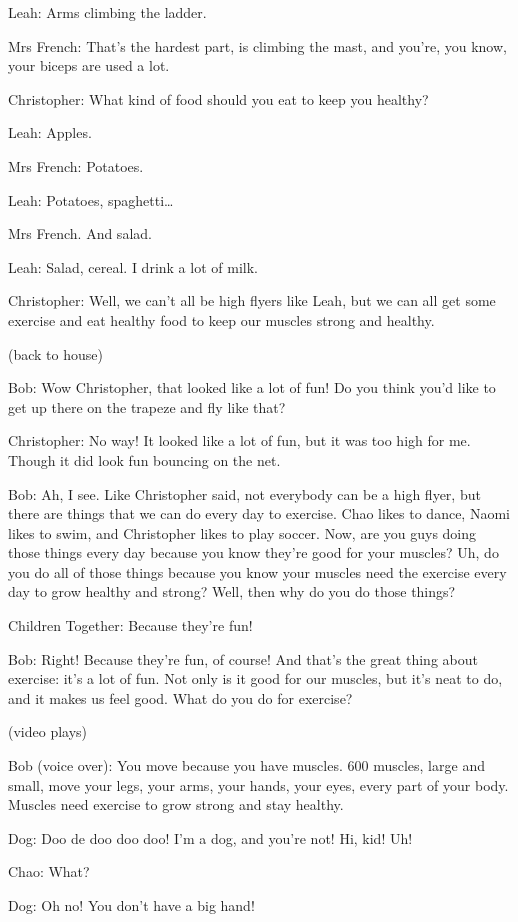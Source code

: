 Leah: Arms climbing the ladder.

Mrs French: That's the hardest part, is climbing the mast, and you're, you know, your biceps are used a lot.

Christopher: What kind of food should you eat to keep you healthy?

Leah: Apples.

Mrs French: Potatoes.

Leah: Potatoes, spaghetti\dots

Mrs French. And salad.

Leah: Salad, cereal. I drink a lot of milk.

Christopher: Well, we can't all be high flyers like Leah, but we can all get some exercise and eat healthy food to keep our muscles strong and healthy.

(back to house)

Bob: Wow Christopher, that looked like a lot of fun! Do you think you'd like to get up there on the trapeze and fly like that?

Christopher: No way! It looked like a lot of fun, but it was too high for me. Though it did look fun bouncing on the net.

Bob: Ah, I see. Like Christopher said, not everybody can be a high flyer, but there are things that we can do every day to exercise. Chao likes to dance, Naomi likes to swim, and Christopher likes to play soccer. Now, are you guys doing those things every day because you know they're good for your muscles? Uh, do you do all of those things because you know your muscles need the exercise every day to grow healthy and strong? Well, then why do you do those things?

Children Together: Because they're fun!

Bob: Right! Because they're fun, of course! And that's the great thing about exercise: it's a lot of fun. Not only is it good for our muscles, but it's neat to do, and it makes us feel good. What do you do for exercise?

(video plays)

Bob (voice over): You move because you have muscles. 600 muscles, large and small, move your legs, your arms, your hands, your eyes, every part of your body. Muscles need exercise to grow strong and stay healthy.

Dog: Doo de doo doo doo! I'm a dog, and you're not! Hi, kid! Uh!

Chao: What?

Dog: Oh no! You don't have a big hand!

